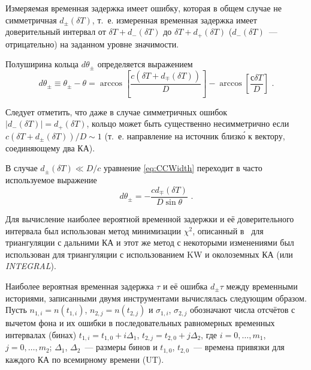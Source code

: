 Измеряемая временная задержка имеет ошибку, которая в общем случае 
не симметричная $d_{\pm}(\delta T)$, т.~е. измеренная временная задержка имеет 
доверительный интервал от $\delta T + d_{-}(\delta T)$ 
до $\delta T + d_{+}(\delta T)$ ($d_{-}(\delta T)$~--- отрицательно) на заданном уровне значимости.

Полуширина кольца $d\theta_{\pm}$ определяется выражением
\begin{equation}\label{eq:CCWidth}
d\theta_{\pm} \equiv \theta_{\pm} -\theta = 
\arccos \left[ \frac{c (\delta T + d_{\mp}(\delta T))}{D} \right] - \arccos\left[ \frac{с \delta T}{D} \right]\mbox{ .}
\end{equation}

Следует отметить, что даже в случае симметричных ошибок $|d_{-}(\delta T)| = d_{+}(\delta T)$, 
кольцо может быть существенно несимметрично если $c (\delta T + d_{\pm}(\delta T))/D \sim 1$ 
(т.~е. направление на источник близк\'{о} к вектору, соединяющему два КА).

В случае $d_{\pm}(\delta T) \ll D/c$ уравнение \ref{eq:CCWidth} переходит в часто используемое выражение
\begin{equation}\label{eq:CCWidthRed}
d \theta_{\pm} = - \frac{c d_{\mp}(\delta T)}{D\sin \theta} \mbox{ .}
\end{equation}

Для вычисление наиболее вероятной временной задержки и её доверительного интервала 
был использован метод минимизации $\chi^2$, описанный в~\citep{Hurley_1999ApJSa} 
для триангуляции с дальними КА и этот же метод с некоторыми изменениями был 
использован для триангуляции с использованием KW и околоземных КА (или \textit{INTEGRAL}).

Наиболее вероятная временная задержка $\tau$ и её ошибка $d_{\pm}\tau$ между 
временными историями, записанными двумя инструментами вычислялась следующим образом. 
Пусть $n_{1,i} = n(t_{1,i})$, $n_{2,j} = n(t_{2,j})$ и 
$\sigma_{1,i}$, $\sigma_{2,j}$ обозначают числа отсчётов с вычетом фона 
и их ошибки в последовательных равномерных временных интервалах (бинах) 
$t_{1,i} = t_{1,0} + i\Delta_{1}$, $t_{2,j} = t_{2,0} + j\Delta_{2}$, 
где $i = 0,\dotsc,m_1$, $j = 0,\dotsc,m_2$; $\Delta_{1}$, 
$\Delta_{2}$~--- размеры бинов и $t_{1,0}$, $t_{2,0}$~--- времена привязки для каждого КА по всемирному времени (UT).

